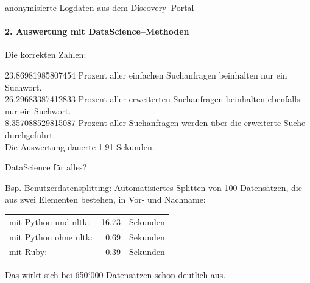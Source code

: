 \begin{frame}{anonymisierte Logdaten aus dem Discovery--Portal}
  \framesubtitle{2. Auswertung mit DataScience--Methoden}
  Die korrekten Zahlen:
  
  23.86981985807454 Prozent aller einfachen Suchanfragen beinhalten nur ein Suchwort.\\
  26.29683387412833 Prozent aller erweiterten Suchanfragen beinhalten ebenfalls nur ein Suchwort.\\
  8.357088529815087 Prozent aller Suchanfragen werden über die erweiterte Suche durchgeführt.\\
  Die Auswertung dauerte  1.91  Sekunden.
\end{frame}


\begin{frame}{DataScience für alles?}
  
  Bsp. Benutzerdatensplitting: Automatisiertes Splitten von 100 Datensätzen, die aus zwei Elementen bestehen, in Vor- und Nachname:
  \medskip

  \begin{tabular}{lrl}
    mit Python und nltk: & 16.73 & Sekunden\tabularnewline
    mit Python ohne nltk: & 0.69 & Sekunden\tabularnewline
    mit Ruby: & 0.39 & Sekunden\tabularnewline
  \end{tabular}
  \medskip

  Das wirkt sich bei 650‘000 Datensätzen schon deutlich aus.
\end{frame}

